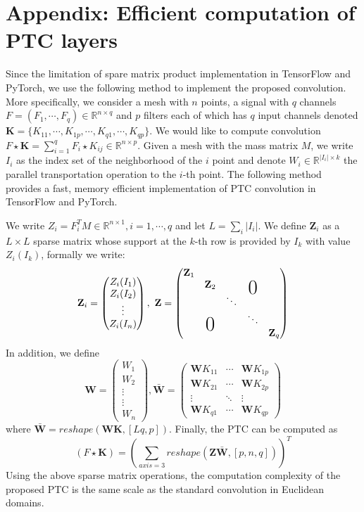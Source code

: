 \documentclass[10pt,twocolumn,letterpaper]{article}
\def\RR{\mathbb{R}}
\newcommand\bigzero{\makebox(0,0){\text{\huge0}}}
\begin{document}
\section*{Appendix: Efficient computation of PTC layers}
Since the limitation of spare matrix product implementation in TensorFlow and PyTorch, we use the following method to implement the proposed convolution. More specifically, we consider a mesh with $n$ points, a signal with $q$ channels $F = (F_1,\cdots,F_q)\in\RR^{n\times q}$ and $p$ filters  each of which has $q$ input channels denoted $\textbf{K} = \{K_{11},\cdots,K_{1p},\cdots,K_{q1},\cdots,K_{qp}\}$. We would like to compute convolution $F\star \textbf{K} =  \sum_{i=1}^{q} F_i \star K_{ij} \in\RR^{n\times p}$. Given a mesh with the mass matrix $M$, we write $I_i$ as the index set of the neighborhood of the $i$ point and denote $W_i\in \RR^{|I_i| \times k}$ the parallel transportation operation to the $i$-th point. 
The following method provides a fast, memory efficient implementation of PTC convolution in TensorFlow and PyTorch. 

We write $Z_i = F_i ^T M \in \RR^{n\times 1} , i = 1,\cdots,q $  and let $L = \sum_{i}|I_i|$. We define $\textbf{Z}_i$ as a $L\times L$ sparse matrix whose support at the $k$-th row is provided by $I_k$ with value $Z_i(I_k)$, formally we write:
$$\textbf{Z}_i = \begin{pmatrix}
Z_i(I_1) \\
Z_i(I_2) \\ 
\vdots   \\  
Z_i(I_n) \\
\end{pmatrix},~
\textbf{Z}= 
\begin{pmatrix}
\textbf{Z}_1   & &   &  &   \\ 
& \textbf{Z}_2 & & \bigzero &  \\ 
& &\ddots  & &  \\ 
& \bigzero & & \ddots    &    \\ 
&  &  & &   \textbf{Z}_q
\end{pmatrix}
$$
In addition, we define
$$
%
\textbf{W} = 
\begin{pmatrix}
W_1 \\ 
W_2 \\ 
\vdots \\ 
\vdots \\
W_n 
\end{pmatrix}, 
\bar{\textbf{W}} = 
\begin{pmatrix}
\textbf{W}K_{11}   & \cdots &  \textbf{W}K_{1p} \\ 
\textbf{W}K_{21}      & \cdots &  \textbf{W}K_{2p} \\ 
\vdots          &                 \ddots    &   \vdots \\ 
 \textbf{W}K_{q1} & \cdots &  \textbf{W}K_{qp}
\end{pmatrix}$$
where $\bar{\textbf{W}} = reshape(\textbf{WK},[Lq,p])$. Finally, the PTC can be computed as 
$$
(F \star \textbf{K})= \left(\sum_{axis = 3} reshape(\textbf{Z}\bar{\textbf{W}},[p,n,q])\right)^T$$
Using the above sparse matrix operations, the computation complexity of the proposed PTC is the same scale as the standard convolution in Euclidean domains.  

{\small


}
\end{document}
